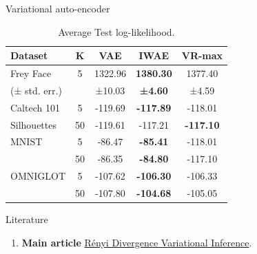 \documentclass{beamer}
\begin{document}
\begin{frame}{Variational auto-encoder}
    \begin{table}[]
        \centering
        \begin{tabular}{l c c c c}
        \hline
             \textbf{Dataset} & K & \textbf{VAE} & \textbf{IWAE} & \textbf{VR-max }\\
             \hline

                Frey Face & 5 &1322.96&\textbf{ 1380.30} & 1377.40\\
                (± std. err.) & & ±10.03 & \textbf{±4.60} & ±4.59 \\
                \hline
            Caltech 101  &5 &-119.69 &\textbf{-117.89} & -118.01 \\
                Silhouettes  & 50 & -119.61 &-117.21& \textbf{-117.10} \\
                \hline
                MNIST  &5& -86.47 & \textbf{-85.41} & -118.01  \\
                 &   50 &-86.35& \textbf{-84.80}& -117.10 \\
                 
                 \hline
                 OMNIGLOT &  5 &-107.62 &\textbf{-106.30} & -106.33\\
                  &50 &-107.80& \textbf{-104.68}&-105.05 \\
                 \hline
                
        \end{tabular}
        \caption{Average Test log-likelihood.}
        \label{tab:my_label}
    \end{table}
\end{frame}


\begin{frame}{Literature}
    \begin{enumerate}
        \item \textbf{Main article} \href{https://proceedings.neurips.cc/paper_files/paper/2016/file/7750ca3559e5b8e1f44210283368fc16-Paper.pdf}
        {Rényi Divergence Variational Inference}.
    \end{enumerate}
\end{frame}
\end{document}
